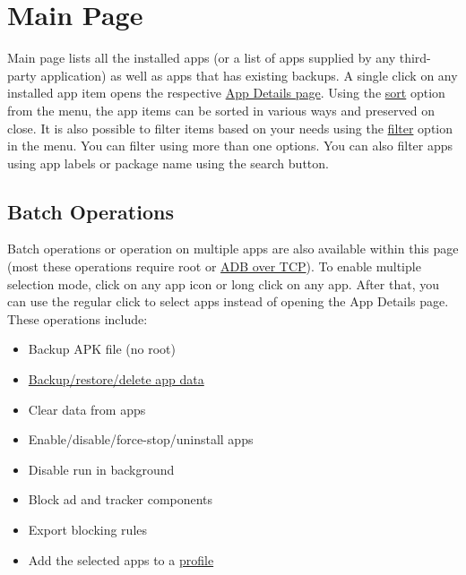 \section{Main Page}\label{sec:main-page}
Main page lists all the installed apps (or a list of apps supplied by any third-party application) as well as apps that
has existing backups. A single click on any installed app item opens the respective \hyperref[sec:app-details-page]{App
Details page}. Using the \hyperlink{par:main-page-sort}{sort} option from the menu, the app items can be sorted in
various ways and preserved on close. It is also possible to filter items based on your needs using the
\hyperlink{par:main-page-filter}{filter} option in the menu. You can filter using more than one options. You can also
filter apps using app labels or package name using the search button.

\subsection{Batch Operations}\label{subsec:batch-operations}
Batch operations or operation on multiple apps are also available within this page (most these operations require root
or \hyperref[sec:adb-over-tcp]{ADB over TCP}). To enable multiple selection mode, click on any app icon or long click
on any app. After that, you can use the regular click to select apps instead of opening the App Details page. These
operations include:
\begin{itemize}
    \item Backup APK file (no root)
    \item \hyperref[sec:backup-restore]{Backup/restore/delete app data}
    \item Clear data from apps
    \item Enable/disable/force-stop/uninstall apps
    \item Disable run in background
    \item Block ad and tracker components
    \item Export blocking rules
    \item Add the selected apps to a \hyperref[sec:profiles-page]{profile}
\end{itemize}

